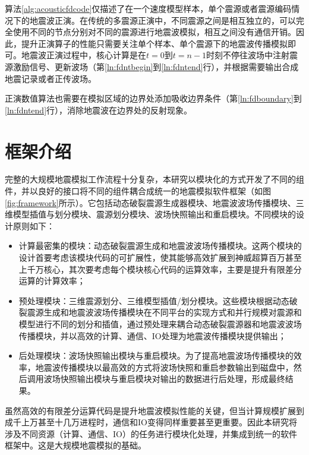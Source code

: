 \documentclass[degree=doctor]{thuthesis}
\begin{document}
算法\ref{alg:acousticfdcode}仅描述了在一个速度模型样本，单个震源或者震源编码情况下的地震波正演。在传统的多震源正演中，不同震源之间是相互独立的，可以完全使用不同的节点分别对不同的震源进行地震波模拟，相互之间没有通信开销。因此，提升正演算子的性能只需要关注单个样本、单个震源下的地震波传播模拟即可。地震波正演过程中，核心计算是在$t=0$到$t=n-1$时刻不停往波场中注射震源激励信号、更新波场（第\ref{ln:fdntbegin}到\ref{ln:fdntend}行），并根据需要输出合成地震记录或者正传波场。

正演数值算法也需要在模拟区域的边界处添加吸收边界条件（第\ref{ln:fdboundary}到\ref{ln:fdntend}行），消除地震波在边界处的反射现象。

\chapter{框架介绍}

完整的大规模地震模拟工作流程十分复杂，本研究以模块化的方式开发了不同的组件，并以良好的接口将不同的组件耦合成统一的地震模拟软件框架（如图\ref{fig:framework}所示）。它包括动态破裂震源生成器模块、地震波波场传播模块、三维模型插值与划分模块、震源划分模块、波场快照输出和重启模块。不同模块的设计原则如下：
\begin{itemize}
  \item 计算最密集的模块：动态破裂震源生成和地震波波场传播模块。这两个模块的设计首要考虑该模块代码的可扩展性，使其能够高效扩展到神威超算百万甚至上千万核心，其次要考虑每个模块核心代码的运算效率，主要是提升有限差分运算的计算效率；
  \item 预处理模块：三维震源划分、三维模型插值/划分模块。这些模块根据动态破裂震源生成和地震波波场传播模块在不同平台的实现方式和并行规模对震源和模型进行不同的划分和插值，通过预处理来耦合动态破裂震源器和地震波波场传播模块，并以高效的计算、通信、IO处理为地震波传播模块提供输出；
  \item 后处理模块：波场快照输出模块与重启模块。为了提高地震波场传播模块的效率，地震波传播模块以最高效的方式将波场快照和重启参数输出到磁盘中，然后调用波场快照输出模块与重启模块对输出的数据进行后处理，形成最终结果。
\end{itemize}

虽然高效的有限差分运算代码是提升地震波模拟性能的关键，但当计算规模扩展到成千上万甚至十几万进程时，通信和IO变得同样重要甚至更重要。因此本研究将涉及不同资源（计算、通信、IO）的任务进行模块化处理，并集成到统一的软件框架中。这是大规模地震模拟的基础。
\end{document}
